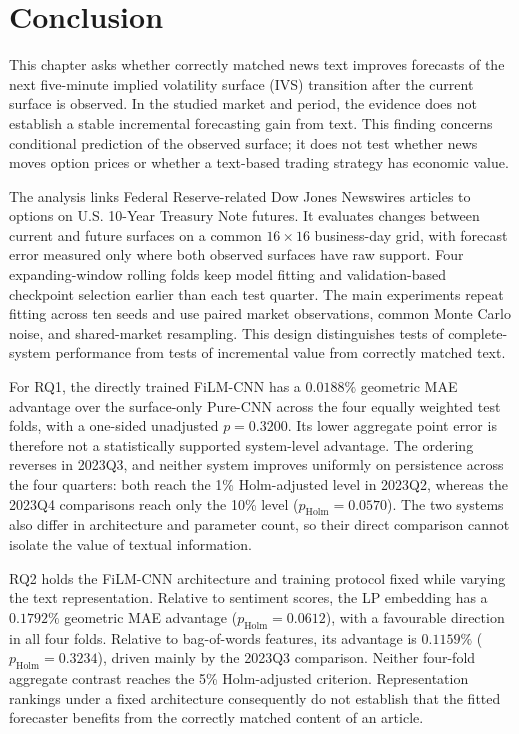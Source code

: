 \section{Conclusion}

This chapter asks whether correctly matched news text improves forecasts of
the next five-minute implied volatility surface (IVS) transition after the
current surface is observed. In the studied market and period, the evidence
does not establish a stable incremental forecasting gain from text. This
finding concerns conditional prediction of the observed surface; it does not
test whether news moves option prices or whether a text-based trading strategy
has economic value.

The analysis links Federal Reserve-related Dow Jones Newswires articles to
options on U.S. 10-Year Treasury Note futures. It evaluates changes between
current and future surfaces on a common $16\times16$ business-day grid, with
forecast error measured only where both observed surfaces have raw support.
Four expanding-window rolling folds keep model fitting and validation-based
checkpoint selection earlier than each test quarter. The main experiments
repeat fitting across ten seeds and use paired market observations, common
Monte Carlo noise, and shared-market resampling. This design distinguishes
tests of complete-system performance from tests of incremental value from
correctly matched text.

For RQ1, the directly trained FiLM-CNN has a $0.0188\%$ geometric MAE
advantage over the surface-only Pure-CNN across the four equally weighted
test folds, with a one-sided unadjusted $p=0.3200$. Its lower aggregate point
error is therefore not a statistically supported system-level advantage.
The ordering reverses in 2023Q3, and neither system improves uniformly on
persistence across the four quarters: both reach the 1\% Holm-adjusted level
in 2023Q2, whereas the 2023Q4 comparisons reach only the 10\% level
($p_{\mathrm{Holm}}=0.0570$). The two systems also differ in architecture and
parameter count, so their direct comparison cannot isolate the value of
textual information.

RQ2 holds the FiLM-CNN architecture and training protocol fixed while varying
the text representation. Relative to sentiment scores, the LP embedding has
a $0.1792\%$ geometric MAE advantage ($p_{\mathrm{Holm}}=0.0612$), with a
favourable direction in all four folds. Relative to bag-of-words features,
its advantage is $0.1159\%$ ($p_{\mathrm{Holm}}=0.3234$), driven mainly by
the 2023Q3 comparison. Neither four-fold aggregate contrast reaches the 5\%
Holm-adjusted criterion. Representation rankings under a fixed architecture
consequently do not establish that the fitted forecaster benefits from the correctly
matched content of an article.

